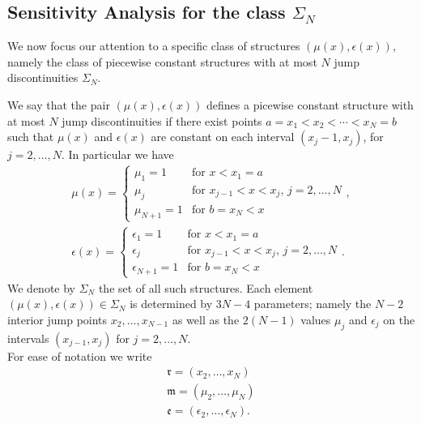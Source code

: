 \subsection{Sensitivity Analysis for the class $\Sigma_N$}
We now focus our attention to a specific class of structures $(\mu(x), \epsilon(x))$, namely the class of piecewise constant structures with at most $N$ jump discontinuities $\Sigma_N$. 
%
%
\begin{defn}
    We say that the pair $(\mu(x), \epsilon(x))$ defines a picewise constant structure with at most $N$ jump discontinuities if there exist points $a = x_1 < x_2 < \cdots < x_N = b$ such that $\mu(x)$ and $\epsilon(x)$ are constant on each interval $(x_j-1,x_j)$, for $j = 2,\dots,N$. In particular we have
    \begin{align}
        \mu(x) = \begin{cases}
        \mu_1 = 1 & \text{for } x < x_1 = a\\
        \mu_j & \text{for } x_{j-1} < x < x_j, \, j=2,\dots,N\\
        \mu_{N+1} = 1 & \text{for } b = x_N < x
        \end{cases},\\
        \epsilon(x) = \begin{cases}
        \epsilon_1 = 1 & \text{for } x < x_1 = a\\
        \epsilon_j & \text{for } x_{j-1} < x < x_j, \, j=2,\dots,N\\
        \epsilon_{N+1} = 1 & \text{for } b = x_N < x
        \end{cases}.
    \end{align}
    We denote by $\Sigma_N$ the set of all such structures. Each element $(\mu(x), \epsilon(x)) \in \Sigma_N$ is determined by $3N-4$ parameters; namely the $N-2$ interior jump points $x_2,\dots,x_{N-1}$ as well as the $2(N-1)$ values $\mu_j$ and $\epsilon_j$ on the intervals $(x_{j-1},x_j)$ for $j=2,\dots,N$.\\
    For ease of notation we write
    \begin{align*}
        \mathfrak{r} = (x_2,\dots,x_N)\\
        \mathfrak{m} = (\mu_2,\dots,\mu_N)\\
        \mathfrak{e} = (\epsilon_2,\dots,\epsilon_N).
    \end{align*}
\end{defn}
%
%
%
